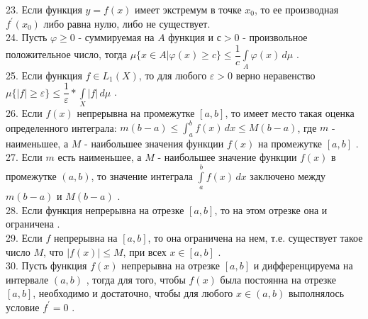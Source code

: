 \documentclass[12pt]{article}
\begin{document}
23. Если функция ${\displaystyle y=f(x)}$ имеет экстремум в точке ${\displaystyle x_0}$, то ее производная ${\displaystyle f^{\prime}(x_0)}$ либо равна нулю, либо не существует.\\

24. Пусть ${\displaystyle \varphi \geq 0}$ - суммируемая на ${\displaystyle A}$ функция и ${\displaystyle с>0}$ - произвольное положительное число, тогда ${\displaystyle \mu\{x \in A \vert \varphi(x) \geq c\} \leq \dfrac{1}{c}\int \limits _{A} \varphi(x) \, d\mu}$ .\\

25. Если функция ${\displaystyle f \in L_1(X)}$, то для любого ${\displaystyle \varepsilon>0}$ верно неравенство ${\displaystyle \mu\{|f| \geq \varepsilon\} \leq \dfrac{1}{\varepsilon}*\int \limits _{X} |f| \, d\mu}$ .\\

26. Если ${\displaystyle f(x)}$ непрерывна на промежутке ${\displaystyle [a,b]}$, то имеет место такая оценка определенного интеграла: ${\displaystyle m(b-a)\leq \int _{a}^{b} f(x)\,dx\leq M(b-a)}$, где ${\displaystyle m}$ - наименьшее, а ${\displaystyle M}$ - наибольшее значения функции ${\displaystyle f(x)}$ на промежутке ${\displaystyle [a,b]}$ .\\

27. Если ${\displaystyle m}$ есть наименьшее, а ${\displaystyle M}$ - наибольшее значение функции ${\displaystyle f(x)}$ в промежутке ${\displaystyle (a,b)}$, то значение интеграла ${\displaystyle \int \limits _{a}^{b} f(x) \, dx}$ заключено между ${\displaystyle m(b-a)}$ и ${\displaystyle M(b-a)}$ .\\

28. Если функция непрерывна на отрезке  ${\displaystyle [a,b]}$, то на этом отрезке она и ограничена .\\

29. Если ${\displaystyle f}$ непрерывна на ${\displaystyle [a,b]}$, то она ограничена на нем, т.е. существует такое число ${\displaystyle M}$, что ${\displaystyle |f(x)| \leq M}$, при всех ${\displaystyle x \in [a,b]}$ .\\

30. Пусть функция ${\displaystyle f(x)}$ непрерывна на отрезке  ${\displaystyle [a,b]}$ и дифференцируема на интервале ${\displaystyle (a,b)}$ , тогда для того, чтобы ${\displaystyle f(x)}$ была постоянна на отрезке ${\displaystyle [a,b]}$, необходимо и достаточно, чтобы для любого ${\displaystyle x \in (a,b)}$ выполнялось условие ${\displaystyle f^{\prime}=0}$ .\\
\end{document}

